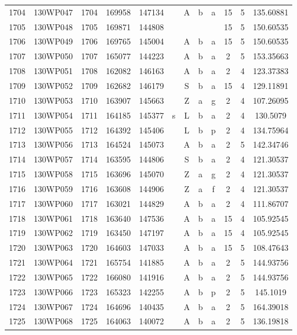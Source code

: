 \begin{tabular}{|*{12}{c|}}
1704 & 130WP047 & 1704 & 169958 & 147134 &  & A & b & a & 15 & 5 & 135.60881 \\ 
1705 & 130WP048 & 1705 & 169871 & 144808 &  &  &  &  & 15 & 5 & 150.60535 \\ 
1706 & 130WP049 & 1706 & 169765 & 145004 &  & A & b & a & 15 & 5 & 150.60535 \\ 
1707 & 130WP050 & 1707 & 165077 & 144223 &  & A & b & a & 2 & 5 & 153.35663 \\ 
1708 & 130WP051 & 1708 & 162082 & 146163 &  & A & b & a & 2 & 4 & 123.37383 \\ 
1709 & 130WP052 & 1709 & 162682 & 146179 &  & S & b & a & 15 & 4 & 129.11891 \\ 
1710 & 130WP053 & 1710 & 163907 & 145663 &  & Z & a & g & 2 & 4 & 107.26095 \\ 
1711 & 130WP054 & 1711 & 164185 & 145377 & s & L & b & a & 2 & 4 & 130.5079 \\ 
1712 & 130WP055 & 1712 & 164392 & 145406 &  & L & b & p & 2 & 4 & 134.75964 \\ 
1713 & 130WP056 & 1713 & 164524 & 145073 &  & A & b & a & 2 & 5 & 142.34746 \\ 
1714 & 130WP057 & 1714 & 163595 & 144806 &  & S & b & a & 2 & 4 & 121.30537 \\ 
1715 & 130WP058 & 1715 & 163696 & 145070 &  & Z & a & g & 2 & 4 & 121.30537 \\ 
1716 & 130WP059 & 1716 & 163608 & 144906 &  & Z & a & f & 2 & 4 & 121.30537 \\ 
1717 & 130WP060 & 1717 & 163021 & 144829 &  & A & b & a & 2 & 4 & 111.86707 \\ 
1718 & 130WP061 & 1718 & 163640 & 147536 &  & A & b & a & 15 & 4 & 105.92545 \\ 
1719 & 130WP062 & 1719 & 163450 & 147197 &  & A & b & a & 15 & 4 & 105.92545 \\ 
1720 & 130WP063 & 1720 & 164603 & 147033 &  & A & b & a & 15 & 5 & 108.47643 \\ 
1721 & 130WP064 & 1721 & 165754 & 141885 &  & A & b & a & 2 & 5 & 144.93756 \\ 
1722 & 130WP065 & 1722 & 166080 & 141916 &  & A & b & a & 2 & 5 & 144.93756 \\ 
1723 & 130WP066 & 1723 & 165323 & 142255 &  & A & b & p & 2 & 5 & 145.1019 \\ 
1724 & 130WP067 & 1724 & 164696 & 140435 &  & A & b & a & 2 & 5 & 164.39018 \\ 
1725 & 130WP068 & 1725 & 164063 & 140072 &  & A & b & a & 2 & 5 & 136.19818 \\ 

\end{tabular}
